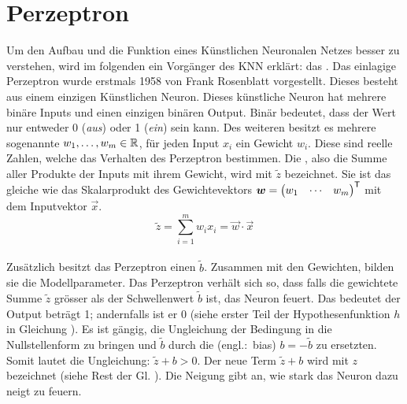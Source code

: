 \section{Perzeptron}
Um den Aufbau und die Funktion eines Künstlichen Neuronalen Netzes besser zu
verstehen, wird im folgenden ein Vorgänger des KNN erklärt: das .
\para{}
Das einlagige Perzeptron wurde erstmals 1958 von Frank Rosenblatt vorgestellt. Dieses
besteht aus einem einzigen Künstlichen Neuron. Dieses künstliche Neuron
hat mehrere binäre Inputs und einen einzigen binären Output. Binär
bedeutet, dass der Wert nur entweder 0 (\textit{aus}) oder 1 (\textit{ein}) sein
kann. Des weiteren besitzt es mehrere sogenannte  $w_1, \ldots,
w_m \in \mathbb{R}$, für jeden Input $x_i$ ein Gewicht $w_i$.
Diese sind reelle Zahlen, welche das Verhalten des Perzeptron bestimmen.
Die , also die Summe aller Produkte der Inputs mit
ihrem Gewicht, wird mit $\tilde{z}$ bezeichnet.
Sie ist das gleiche wie das Skalarprodukt des Gewichtevektors
$\bm{w} = \begin{pmatrix} w_1 & \cdots & w_m \end{pmatrix}^{\mathsf{T}}$ mit dem
Inputvektor $\vec{x}$. \\
\begin{equation*}
  \tilde{z} = \sum_{i=1}^{m} w_i x_i = \vec{w} \cdot \vec{x}
\end{equation*} \\
Zusätzlich besitzt das Perzeptron einen  $\tilde{b}$.
Zusammen mit den Gewichten, bilden sie die Modellparameter.
Das Perzeptron verhält sich so, dass falls die gewichtete Summe $\tilde{z}$ grösser als der
Schwellenwert $\tilde{b}$ ist, das Neuron feuert. Das bedeutet der Output beträgt 1;
andernfalls ist er 0 (siehe erster Teil der Hypothesenfunktion $h$ in Gleichung ).
Es ist gängig, die Ungleichung der Bedingung in die Nullstellenform zu bringen
und $\tilde{b}$ durch die  (engl.:\ bias)
$b = -\tilde{b}$ zu ersetzten. Somit lautet die Ungleichung: $\tilde{z} + b
> 0$. Der neue Term $\tilde{z} + b$ wird mit $z$ bezeichnet (siehe Rest der Gl. ).
Die Neigung gibt an, wie stark das Neuron dazu neigt zu feuern.\\

